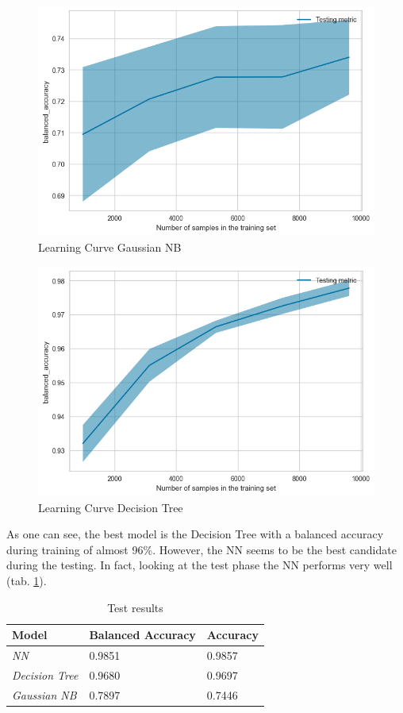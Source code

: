 \documentclass[unicode,11pt,a4paper,oneside,numbers=endperiod,openany]{scrartcl}
\begin{document}
\begin{figure}[H]
  \includegraphics[scale=0.6]{images/GaussianNBtrainingLoss.png}
  \centering
  \caption{Learning Curve Gaussian NB}
  \label{fig:GNBloss}
\end{figure}
\begin{figure}[H]
  \includegraphics[scale=0.6]{images/DTtrainingLoss.png}
  \centering
  \caption{Learning Curve Decision Tree}
  \label{fig:DTloss}
\end{figure}
As one can see, 
the best model is 
the Decision Tree with a balanced 
accuracy during training of almost 
96\%. However, the NN seems to be the best
 candidate during the testing. In fact, 
 looking at the test phase the NN performs
  very well (tab. \ref{tab:testResults}).
\begin{table}[H]
  \centering
  \begin{tabular}{|l|l|l|}
  \hline
  \textbf{Model}         & \textbf{Balanced Accuracy} & \textbf{Accuracy} \\ \hline
  \textit{NN}            & 0.9851                     & 0.9857            \\ \hline
  \textit{Decision Tree} & 0.9680                     & 0.9697            \\ \hline
  \textit{Gaussian NB}   & 0.7897                     & 0.7446            \\ \hline
  \end{tabular}
  \caption{Test results}
  
  \label{tab:testResults}
  
  \end{table}
\end{document}
